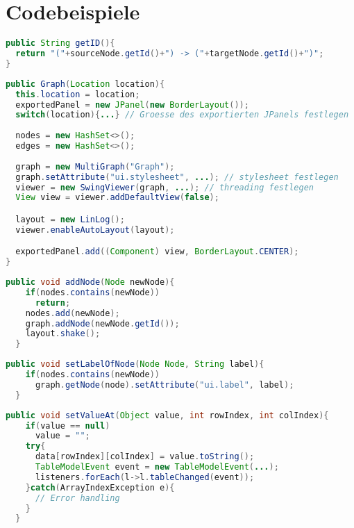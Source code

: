 \section{Codebeispiele}
\begin{lstlisting}[language=Java, caption={Generieren der ID für eine Kante}, label={cde:edge-id}]
public String getID(){
  return "("+sourceNode.getId()+") -> ("+targetNode.getId()+")";
}
\end{lstlisting}

\begin{lstlisting}[language=Java, caption={Konstruktor der Klasse ThreeAddressCodeInstruction}, label={cde:graph-constructor}]
public Graph(Location location){
  this.location = location;
  exportedPanel = new JPanel(new BorderLayout());
  switch(location){...} // Groesse des exportierten JPanels festlegen
  
  nodes = new HashSet<>();
  edges = new HashSet<>();
  
  graph = new MultiGraph("Graph");
  graph.setAttribute("ui.stylesheet", ...); // stylesheet festlegen
  viewer = new SwingViewer(graph, ...); // threading festlegen
  View view = viewer.addDefaultView(false);

  layout = new LinLog();
  viewer.enableAutoLayout(layout);

  exportedPanel.add((Component) view, BorderLayout.CENTER);
}
\end{lstlisting}
\begin{lstlisting}[language=Java, caption={Implementierung der addNode(Node) Methode}, label={cde:graph-addNode}]
  public void addNode(Node newNode){
    if(nodes.contains(newNode))
      return;
    nodes.add(newNode);
    graph.addNode(newNode.getId());
    layout.shake();
  }
\end{lstlisting}
\begin{lstlisting}[language=Java, caption={Implementierung der setLabelOfNode(Node, String) Methode}, label={cde:graph-labelNode}]
  public void setLabelOfNode(Node Node, String label){
    if(nodes.contains(newNode))
      graph.getNode(node).setAttribute("ui.label", label);
  }
\end{lstlisting}

\begin{lstlisting}[language=Java, caption={Implementierung der setValueAtMethode(Object, int, int) Methode}, label={cde:setValueAt}]
  public void setValueAt(Object value, int rowIndex, int colIndex){
    if(value == null)
      value = "";
    try{
      data[rowIndex][colIndex] = value.toString();
      TableModelEvent event = new TableModelEvent(...);
      listeners.forEach(l->l.tableChanged(event));
    }catch(ArrayIndexException e){
      // Error handling
    }
  }
\end{lstlisting}


